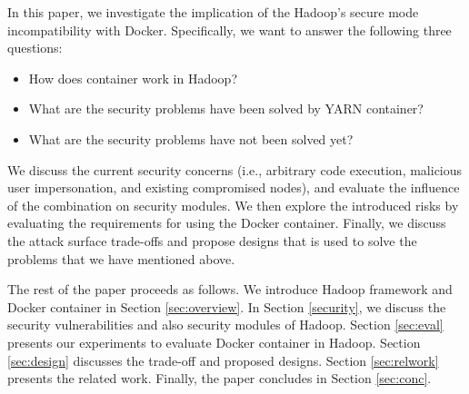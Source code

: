 In this paper, we investigate the implication of the Hadoop's secure mode incompatibility with Docker. Specifically, we want to answer the following three questions:
\begin{itemize}
\item {How does container work in Hadoop?}
\item {What are the security problems have been solved by YARN container?}
\item {What are the security problems have not been solved yet?}
\end{itemize}

We discuss the current security concerns (i.e., arbitrary code execution, malicious user impersonation, and existing compromised nodes), and evaluate the influence of the combination on security modules. We then explore the introduced risks by evaluating the requirements for using the Docker container. Finally, we discuss the attack surface trade-offs and propose designs that is used to solve the problems that we have mentioned above.

The rest of the paper proceeds as follows. We introduce Hadoop framework and Docker container in Section \ref{sec:overview}. In Section \ref{security}, we discuss the security vulnerabilities and also security modules of Hadoop. Section \ref{sec:eval} presents our experiments to evaluate Docker container in Hadoop. Section \ref{sec:design} discusses the trade-off and proposed designs. Section \ref{sec:relwork} presents the related work. Finally, the paper concludes in Section \ref{sec:conc}.

